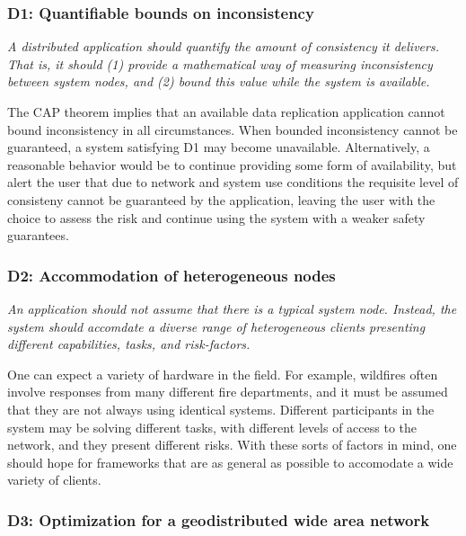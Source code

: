 \documentclass[]             %
{NASA}                       %
\theoremstyle{definition}
\begin{document}
\hypertarget{d1-quantifiable-bounds-on-inconsistency}{%
\subsubsection{D1: Quantifiable bounds on
inconsistency}\label{d1-quantifiable-bounds-on-inconsistency}}

\emph{A distributed application should quantify the amount of
consistency it delivers. That is, it should (1) provide a mathematical
way of measuring inconsistency between system nodes, and (2) bound
this value while the system is available.}

The CAP theorem implies that an available data replication application
cannot bound inconsistency in all circumstances. When bounded
inconsistency cannot be guaranteed, a system satisfying D1 may become
unavailable. Alternatively, a reasonable behavior would be to continue
providing some form of availability, but alert the user that due to
network and system use conditions the requisite level of consisteny
cannot be guaranteed by the application, leaving the user with the
choice to assess the risk and continue using the system with a weaker
safety guarantees.

\hypertarget{d2-accommodation-of-heterogeneous-nodes}{%
\subsubsection{D2: Accommodation of heterogeneous
nodes}\label{d2-accommodation-of-heterogeneous-nodes}}

\emph{An application should not assume that there is a typical system
node. Instead, the system should accomdate a diverse range of
heterogeneous clients presenting different capabilities, tasks, and
risk-factors.}

One can expect a variety of hardware in the field. For example,
wildfires often involve responses from many different fire departments,
and it must be assumed that they are not always using identical systems.
Different participants in the system may be solving different tasks,
with different levels of access to the network, and they present
different risks. With these sorts of factors in mind, one should hope
for frameworks that are as general as possible to accomodate a wide
variety of clients.

\hypertarget{d3-optimization-for-a-geodistributed-wide-area-network}{%
\subsubsection{D3: Optimization for a geodistributed wide area
network}\label{d3-optimization-for-a-geodistributed-wide-area-network}}
\end{document}
